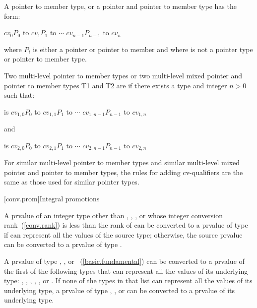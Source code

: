 \pnum
{}%
%
A  pointer to member type, or a
 pointer and pointer to member type has the
form:

\begin{indented}
$\mathit{cv}_0 P_0$ to $\mathit{cv}_1P_1$ to $\cdots$ $\mathit{cv}_{n-1}P_{n-1}$
to $\mathit{cv}_n$ 
\end{indented}

where $P_i$ is either a pointer or pointer to member and where 
is not a pointer type or pointer to member type.

\pnum
Two multi-level pointer to member types or two multi-level mixed pointer
and pointer to member types T1 and T2 are  if there
exists a type  and integer $n > 0$ such that:

\begin{indented}
 is $\mathit{cv}_{1,0}P_0$ to $\mathit{cv}_{1,1}P_1$
to $\cdots$ $\mathit{cv}_{1,n-1}P_{n-1}$ to $\mathit{cv}_{1,n}$ 
\end{indented}

and

\begin{indented}
 is $\mathit{cv}_{2,0}P_0$ to $\mathit{cv}_{2,1}P_1$
to $\cdots$ $\mathit{cv}_{2,n-1}P_{n-1}$ to $\mathit{cv}_{2,n}$ 
\end{indented}

\pnum
For similar multi-level pointer to member types and similar multi-level
mixed pointer and pointer to member types, the rules for adding
cv-qualifiers are the same as those used for similar pointer types.%

[conv.prom]{Integral promotions}

\pnum
{}%
A prvalue of an integer type other than , ,
, or  whose integer conversion
rank~(\ref{conv.rank}) is less than the rank of  can be
converted to a prvalue of type  if  can represent
all the values of the source type; otherwise, the source prvalue can be
converted to a prvalue of type .

\pnum
A prvalue of type , , or
~(\ref{basic.fundamental}) can be converted to a prvalue
of the first of the following types that can represent all the values of
its underlying type: , , 
,  , ,
or . If none of the types in that list can
represent all the values of its underlying type, a prvalue of type
, , or  can be converted
to a prvalue of its underlying type.


